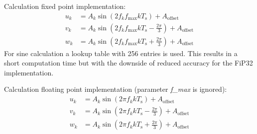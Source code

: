 %
%
%
%
%
%
%
%
Calculation fixed point implementation:
\begin{align*}
	u_k &= A_k \sin\left(2 f_k f_{\max} k T_{\mathrm{s}}\right) + A_{\mathrm{offset}}
	\\
	v_k &= A_k \sin\left(2 f_k f_{\max} k T_{\mathrm{s}} - \frac{2\pi}{3}\right) + A_{\mathrm{offset}}
	\\
	w_k &= A_k \sin\left(2 f_k f_{\max} k T_{\mathrm{s}} + \frac{2\pi}{3}\right) + A_{\mathrm{offset}}
\end{align*}
For sine calculation a lookup table with 256 entries is used. This results in a short computation time but with the downside of reduced accuracy for the FiP32 implementation.

\medskip
Calculation floating point implementation (parameter \textit{f\_max} is ignored):
\begin{align*}
	u_k &= A_k \sin\left(2 \pi f_k k T_{\mathrm{s}}\right) + A_{\mathrm{offset}}
	\\
	v_k &= A_k \sin\left(2 \pi f_k k T_{\mathrm{s}} - \frac{2\pi}{3}\right) + A_{\mathrm{offset}}
	\\
	w_k &= A_k \sin\left(2 \pi f_k k T_{\mathrm{s}} + \frac{2\pi}{3}\right) + A_{\mathrm{offset}}
\end{align*}